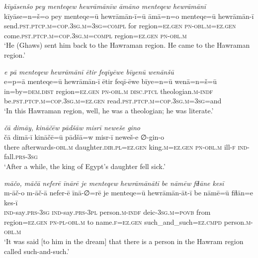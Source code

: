 \ea \label{ZP.21}
\textit{kīyāsenšo pey menteqew hewrāmānīw āmāno menteqew hewrāmānī} \\ 
\gll kīyāse=n=š=o pey menteqe=ū hewrāmān-ī=ū āmā=n=o menteqe=ū hewrāmān-ī \\ 
 send\textsc{.pst}\textsc{.ptcp}\textsc{.m}\textsc{=cop}\textsc{.3sg}\textsc{.m}\textsc{=3sg}\textsc{=compl} for region\textsc{\textsc{=ez.gen}} \textsc{pn}\textsc{-obl}\textsc{.m}\textsc{\textsc{=ez.gen}} come\textsc{.pst}\textsc{.ptcp}\textsc{.m}\textsc{=cop}\textsc{.3sg}\textsc{.m}\textsc{=compl} region\textsc{\textsc{=ez.gen}} \textsc{pn}\textsc{-obl}\textsc{.m} \\ 
\glt `He (Ghaws) sent him back to the Hawraman region. He came to the Hawraman region.'
\z 
 
\ea \label{ZP.23}
\textit{e pā menteqew hewrāmānī ētir feqīyēwe bīyenū wenānšū} \\ 
\gll e=p=ā menteqe=ū hewrāmān-ī ētir feqī-ēwe bīye=n=ū wenā=n=š=ū \\ 
 in=by=\textsc{dem.dist} region\textsc{\textsc{=ez.gen}} \textsc{pn}\textsc{-obl}\textsc{.m} \textsc{disc.ptcl} theologian\textsc{.m}\textsc{-indf} be\textsc{.pst}\textsc{.ptcp}\textsc{.m}\textsc{=cop}\textsc{.3sg}\textsc{.m}\textsc{\textsc{=ez.gen}} read\textsc{.pst}\textsc{.ptcp}\textsc{.m}\textsc{=cop}\textsc{.3sg}\textsc{.m}\textsc{=3sg}=and \\ 
\glt `In this Hawraman region, well, he was a theologian; he was literate.'
\z 
 
\ea \label{ZP.25}
\textit{čā dimāy, kināčēw pādšāw misrī neweše gino} \\ 
\gll čā dimā-ī kināčē=ū pādšā=w misr-ī neweš-e ∅-gin-o \\ 
 there afterwards\textsc{-obl}\textsc{.m} daughter\textsc{.dir}\textsc{.pl}\textsc{\textsc{=ez.gen}} king\textsc{.m}\textsc{\textsc{=ez.gen}} \textsc{pn}\textsc{-obl}\textsc{.m} ill\textsc{-f} \textsc{ind-}fall\textsc{.prs}\textsc{-3sg} \\ 
\glt `After a while, the king of Egypt’s daughter fell sick.'
\z 
 
\ea \label{ZP.31}
\textit{māčo, māčā neferē īnārē je menteqew hewrāmānātī be nāmēw fiɫāne kesī} \\ 
\gll m-āč-o m-āč-ā nefer-ē īnā-∅=rē je menteqe=ū hewrāmān-āt-ī be nāmē=ū fiɫān=e kes-ī \\ 
 \textsc{ind-}say\textsc{.prs}\textsc{-3sg} \textsc{ind-}say\textsc{.prs}\textsc{-3pl} person\textsc{.m}\textsc{-indf} deic\textsc{-3sg}\textsc{.m}\textsc{=\textsc{povb}} from region\textsc{\textsc{=ez.gen}} \textsc{pn}\textsc{\textsc{-pl}}\textsc{-obl}\textsc{.m} to name\textsc{.f}\textsc{\textsc{=ez.gen}} such\_and\_such\textsc{=ez}\textsc{.cmpd} person\textsc{.m}\textsc{-obl}\textsc{.m} \\ 
\glt `It was said [to him in the dream] that there is a person in the Hawram region called such-and-such.'
\z 
 
